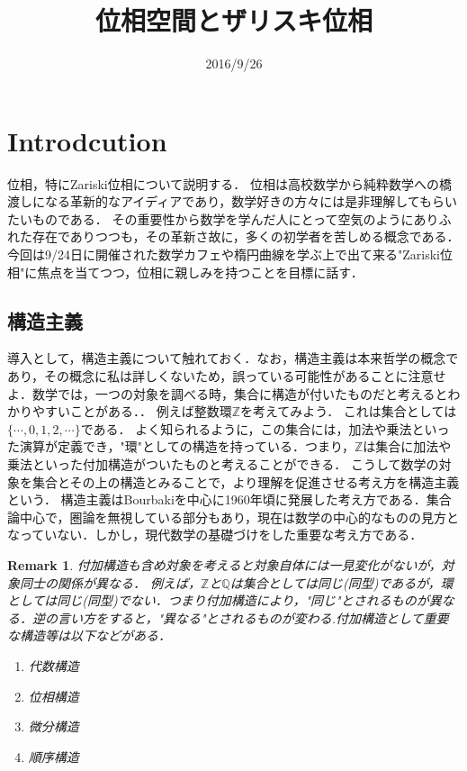 \documentclass{ujarticle}
\title{位相空間とザリスキ位相}
\date{2016/9/26}
\newtheorem*{rem}{Remark}
\begin{document}
\maketitle

\section{Introdcution}
\label{sec:Introdcution}
位相，特にZariski位相について説明する．
位相は高校数学から純粋数学への橋渡しになる革新的なアイディアであり，数学好きの方々には是非理解してもらいたいものである．
その重要性から数学を学んだ人にとって空気のようにありふれた存在でありつつも，その革新さ故に，多くの初学者を苦しめる概念である．
今回は9/24日に開催された数学カフェや楕円曲線を学ぶ上で出て来る"Zariski位相"に焦点を当てつつ，位相に親しみを持つことを目標に話す．
\subsection{構造主義}
\label{sub:構造主義}
導入として，構造主義について触れておく．なお，構造主義は本来哲学の概念であり，その概念に私は詳しくないため，誤っている可能性があることに注意せよ．数学では，一つの対象を調べる時，集合に構造が付いたものだと考えるとわかりやすいことがある．．
例えば整数環$\mathbb{Z}$を考えてみよう．
これは集合としては$\{ \cdots, 0,1,2, \cdots \}$である．
よく知られるように，この集合には，加法や乗法といった演算が定義でき，"環"としての構造を持っている．つまり，$\mathbb{Z}$は集合に加法や乗法といった付加構造がついたものと考えることができる．
こうして数学の対象を集合とその上の構造とみることで，より理解を促進させる考え方を構造主義という．
構造主義はBourbakiを中心に1960年頃に発展した考え方である．集合論中心で，圏論を無視している部分もあり，現在は数学の中心的なものの見方となっていない．しかし，現代数学の基礎づけをした重要な考え方である．
\begin{rem}
  付加構造も含め対象を考えると対象自体には一見変化がないが，対象同士の関係が異なる．
  例えば，$\mathbb{Z}$と$\mathbb{Q}$は集合としては同じ(同型)であるが，環としては同じ(同型)でない．つまり付加構造により，"同じ"とされるものが異なる．逆の言い方をすると，"異なる"とされるものが変わる.付加構造として重要な構造等は以下などがある．
  \begin{enumerate}
    \setlength{\parskip}{0cm} %
    \setlength{\itemsep}{0cm} %
    \item 代数構造
    \item 位相構造
    \item 微分構造
    \item 順序構造
  \end{enumerate}
\end{rem}
\end{document}
